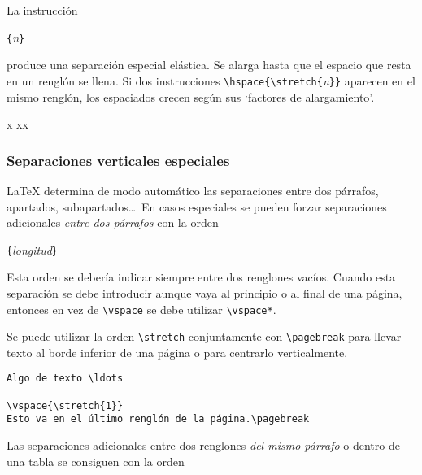 La instrucción
\begin{command}
\verb|{|\emph{n}\verb|}|
\end{command} 

\noindent produce  una separación  especial elástica. Se  alarga hasta
que el espacio que resta en  un renglón se llena. Si dos instrucciones
\verb|\hspace{\stretch{|\emph{n}\verb|}}|   aparecen   en   el   mismo
renglón, los espaciados crecen según sus `factores de alargamiento'.

\begin{example}
x
xx
\end{example}

\subsubsection{Separaciones verticales especiales}

\LaTeX{}  determina  de modo  automático  las  separaciones entre  dos
párrafos, apartados, subapartados\ldots\ En casos especiales se pueden
forzar separaciones adicionales \emph{entre dos párrafos} con la orden

\begin{command}
\verb|{|\emph{longitud}\verb|}|
\end{command}

Esta  orden se  debería indicar  siempre entre  dos renglones  vacíos.
Cuando esta se\-pa\-ra\-ción  se debe introducir aunque vaya  al principio o
al final  de una  página, entonces  en vez  de \verb|\vspace|  se debe
utilizar \verb|\vspace*|. 

Se  puede   utilizar  la   orden  \verb|\stretch|   conjuntamente  con
\verb|\pagebreak| para llevar texto al  borde inferior de una página o
para centrarlo verticalmente.

\begin{code}
\begin{verbatim}
Algo de texto \ldots

\vspace{\stretch{1}}
Esto va en el último renglón de la página.\pagebreak
\end{verbatim}
\end{code}

Las  separaciones  adicionales  entre dos  renglones  \emph{del  mismo
párrafo} o dentro de una tabla se consiguen con la orden

